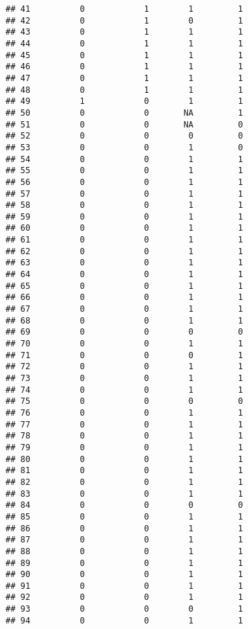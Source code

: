 \documentclass[
]{article}
\begin{document}
\begin{verbatim}
## 41          0            1        1         1
## 42          0            1        0         1
## 43          0            1        1         1
## 44          0            1        1         1
## 45          0            1        1         1
## 46          0            1        1         1
## 47          0            1        1         1
## 48          0            1        1         1
## 49          1            0        1         1
## 50          0            0       NA         1
## 51          0            0       NA         0
## 52          0            0        0         0
## 53          0            0        1         0
## 54          0            0        1         1
## 55          0            0        1         1
## 56          0            0        1         1
## 57          0            0        1         1
## 58          0            0        1         1
## 59          0            0        1         1
## 60          0            0        1         1
## 61          0            0        1         1
## 62          0            0        1         1
## 63          0            0        1         1
## 64          0            0        1         1
## 65          0            0        1         1
## 66          0            0        1         1
## 67          0            0        1         1
## 68          0            0        1         1
## 69          0            0        0         0
## 70          0            0        1         1
## 71          0            0        0         1
## 72          0            0        1         1
## 73          0            0        1         1
## 74          0            0        1         1
## 75          0            0        0         0
## 76          0            0        1         1
## 77          0            0        1         1
## 78          0            0        1         1
## 79          0            0        1         1
## 80          0            0        1         1
## 81          0            0        1         1
## 82          0            0        1         1
## 83          0            0        1         1
## 84          0            0        0         0
## 85          0            0        1         1
## 86          0            0        1         1
## 87          0            0        1         1
## 88          0            0        1         1
## 89          0            0        1         1
## 90          0            0        1         1
## 91          0            0        1         1
## 92          0            0        1         1
## 93          0            0        0         1
## 94          0            0        1         1

\end{verbatim}
\end{document}
